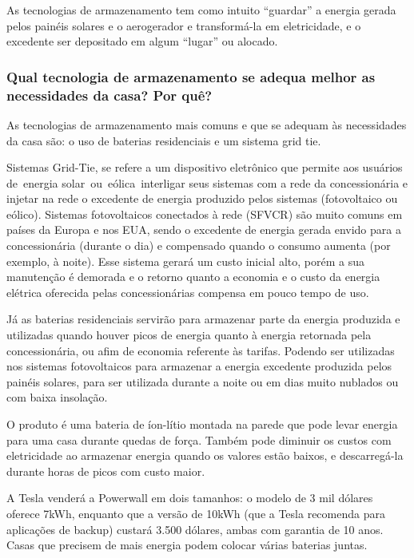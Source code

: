 	As tecnologias de armazenamento tem como intuito “guardar” a energia gerada pelos painéis solares e o aerogerador e transformá-la em eletricidade, e o excedente ser depositado em algum “lugar” ou alocado. 

\subsubsection{Qual tecnologia de armazenamento se adequa melhor as necessidades da casa? Por quê?}

	As tecnologias de armazenamento mais comuns e que se adequam às necessidades da casa são: o uso de baterias residenciais e um sistema grid tie.
	 
	Sistemas Grid-Tie, se refere a um dispositivo eletrônico que permite aos usuários de energia solar ou eólica interligar seus sistemas com a rede da concessionária e injetar na rede o excedente de energia produzido pelos sistemas (fotovoltaico ou eólico).\cite{neosolarinversorfronius} Sistemas fotovoltaicos conectados à rede (SFVCR) são muito comuns em países da Europa e nos EUA, sendo o excedente de energia gerada envido para a concessionária (durante o dia) e compensado quando o consumo aumenta (por exemplo, à noite). Esse sistema gerará um custo inicial alto, porém a sua manutenção é demorada e o retorno quanto a economia e o custo da energia elétrica oferecida pelas concessionárias compensa em pouco tempo de uso.
	
	Já as baterias residenciais servirão para armazenar parte da energia produzida e utilizadas quando houver picos de energia quanto à energia retornada pela concessionária, ou afim de economia referente às tarifas. Podendo ser utilizadas nos sistemas fotovoltaicos para armazenar a energia excedente produzida pelos painéis solares, para ser utilizada durante a noite ou em dias muito nublados ou com baixa insolação. \cite{minhacasasolar}

	O produto é uma bateria de íon-lítio montada na parede que pode levar energia para uma casa durante quedas de força. Também pode diminuir os custos com eletricidade ao armazenar energia quando os valores estão baixos, e descarregá-la durante horas de picos com custo maior. 

	A Tesla venderá a Powerwall em dois tamanhos: o modelo de 3 mil dólares oferece 7kWh, enquanto que a versão de 10kWh (que a Tesla recomenda para aplicações de backup) custará 3.500 dólares, ambas com garantia de 10 anos. Casas que precisem de mais energia podem colocar várias baterias juntas.\cite{Powerwall}

